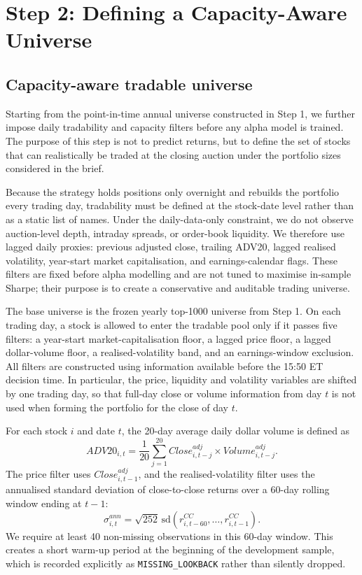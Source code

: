 \documentclass[12pt]{article}
\begin{document}
\section{Step 2: Defining a Capacity-Aware Universe }

\subsection{Capacity-aware tradable universe}

Starting from the point-in-time annual universe constructed in Step 1, we further impose daily tradability and capacity filters before any alpha model is trained. The purpose of this step is not to predict returns, but to define the set of stocks that can realistically be traded at the closing auction under the portfolio sizes considered in the brief.

Because the strategy holds positions only overnight and rebuilds the portfolio every trading day, tradability must be defined at the stock-date level rather than as a static list of names. Under the daily-data-only constraint, we do not observe auction-level depth, intraday spreads, or order-book liquidity. We therefore use lagged daily proxies: previous adjusted close, trailing ADV20, lagged realised volatility, year-start market capitalisation, and earnings-calendar flags. These filters are fixed before alpha modelling and are not tuned to maximise in-sample Sharpe; their purpose is to create a conservative and auditable trading universe.

The base universe is the frozen yearly top-1000 universe from Step 1. On each trading day, a stock is allowed to enter the tradable pool only if it passes five filters: a year-start market-capitalisation floor, a lagged price floor, a lagged dollar-volume floor, a realised-volatility band, and an earnings-window exclusion. All filters are constructed using information available before the 15:50 ET decision time. In particular, the price, liquidity and volatility variables are shifted by one trading day, so that full-day close or volume information from day $t$ is not used when forming the portfolio for the close of day $t$.

For each stock $i$ and date $t$, the 20-day average daily dollar volume is defined as
\[
ADV20_{i,t}
=
\frac{1}{20}
\sum_{j=1}^{20}
Close^{adj}_{i,t-j} \times Volume^{adj}_{i,t-j}.
\]
The price filter uses $Close^{adj}_{i,t-1}$, and the realised-volatility filter uses the annualised standard deviation of close-to-close returns over a 60-day rolling window ending at $t-1$:
\[
\sigma^{ann}_{i,t}
=
\sqrt{252}\,
\mathrm{sd}
\left(
r^{CC}_{i,t-60}, \ldots, r^{CC}_{i,t-1}
\right).
\]
We require at least 40 non-missing observations in this 60-day window. This creates a short warm-up period at the beginning of the development sample, which is recorded explicitly as \texttt{MISSING\_LOOKBACK} rather than silently dropped.
\end{document}
